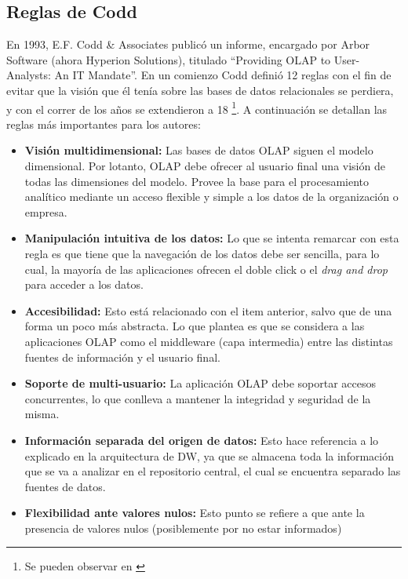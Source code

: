 \documentclass[a4paper,11pt]{article}
\begin{document}
    
    \subsection{Reglas de Codd}
    
    En 1993, E.F. Codd \& Associates publicó un informe, encargado por Arbor Software (ahora Hyperion Solutions), titulado ``Providing OLAP to User-Analysts:
    An IT Mandate''.
    En un comienzo Codd definió 12 reglas con el fin de evitar que la visión que él tenía sobre las bases de datos relacionales se perdiera, y con el correr
    de los años se extendieron a 18 \footnote{Se pueden observar en \cite[p.~205]{nagabhushana}}. A continuación se detallan las reglas más importantes 
    para los autores:
    
    \begin{itemize}
      \item \textbf{Visión multidimensional:} Las bases de datos OLAP siguen el modelo dimensional. Por lotanto, OLAP debe ofrecer al usuario final
      una visión de todas las dimensiones del modelo. Provee la base para el procesamiento analítico mediante un acceso flexible y simple a los datos de la 
      organización o empresa.
      \item \textbf{Manipulación intuitiva de los datos:} Lo que se intenta remarcar con esta regla es que tiene que la navegación de los datos debe ser
      sencilla, para lo cual, la mayoría de las aplicaciones ofrecen el doble click o el \textit{drag and drop} para acceder a los datos.
      \item \textbf{Accesibilidad:} Esto está relacionado con el item anterior, salvo que de una forma un poco más abstracta. Lo que plantea es que se
      considera a las aplicaciones OLAP como el middleware (capa intermedia) entre las distintas fuentes de información y el usuario final.
      \item \textbf{Soporte de multi-usuario:} La aplicación OLAP debe soportar accesos concurrentes, lo que conlleva a mantener la integridad y seguridad
      de la misma.
      \item \textbf{Información separada del origen de datos:} Esto hace referencia a lo explicado en la arquitectura de DW, ya que se almacena toda la
      información que se va a analizar en el repositorio central, el cual se encuentra separado las fuentes de datos.
      \item \textbf{Flexibilidad ante valores nulos:} Esto punto se refiere a que ante la presencia de valores nulos (posiblemente por no estar informados)

\end{itemize}
\end{document}
